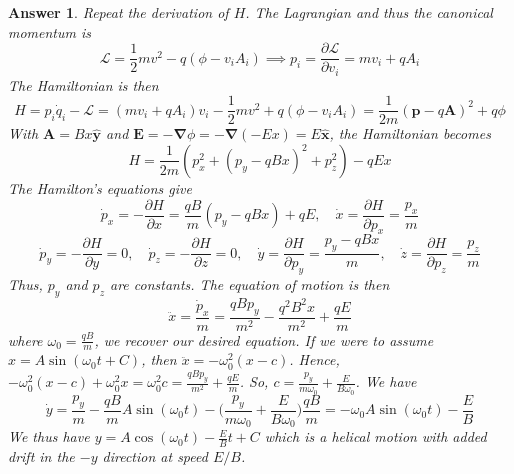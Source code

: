 \documentclass[a4paper]{article}
\newtheorem{ans}{Answer}[section]
\theoremstyle{new}
\begin{document}
\begin{ans}
Repeat the derivation of $H$. The Lagrangian and thus the canonical momentum is
$$\mathcal{L}=\frac{1}{2}mv^2-q(\phi-v_iA_i)\implies p_i=\frac{\partial\mathcal{L}}{\partial v_i}=mv_i+qA_i$$
The Hamiltonian is then
$$H=p_i\dot{q}_i-\mathcal{L}=(mv_i+qA_i)v_i-\frac{1}{2}mv^2+q(\phi-v_iA_i)=\frac{1}{2m}(\mathbf{p}-q\mathbf{A})^2+q\phi$$
With $\mathbf{A}=Bx\mathbf{\hat{y}}$ and $\mathbf{E}=-\boldsymbol{\nabla}\phi=-\boldsymbol{\nabla}(-Ex)=E\mathbf{\hat{x}}$, the Hamiltonian becomes
$$H=\frac{1}{2m}(p_x^2+(p_y-qBx)^2+p_z^2)-qEx$$
The Hamilton's equations give
$$\dot{p}_x=-\frac{\partial H}{\partial x}=\frac{qB}{m}(p_y-qBx)+qE,\quad\dot{x}=\frac{\partial H}{\partial p_x}=\frac{p_x}{m}$$
$$\dot{p}_y=-\frac{\partial H}{\partial y}=0,\quad\dot{p}_z=-\frac{\partial H}{\partial z}=0,\quad\dot{y}=\frac{\partial H}{\partial p_y}=\frac{p_y-qBx}{m},\quad\dot{z}=\frac{\partial H}{\partial p_z}=\frac{p_z}{m}$$
Thus, $p_y$ and $p_z$ are constants. The equation of motion is then 
$$\ddot{x}=\frac{\dot{p}_x}{m}=\frac{qBp_y}{m^2}-\frac{q^2B^2x}{m^2}+\frac{qE}{m}$$
where $\omega_0=\frac{qB}{m}$, we recover our desired equation. If we were to assume $x=A\sin(\omega_0t+C)$, then $\ddot{x}=-\omega_0^2(x-c)$. Hence, $-\omega_0^2(x-c)+\omega_0^2x=\omega_0^2c=\frac{qBp_y}{m^2}+\frac{qE}{m}$. So, $c=\frac{p_y}{m\omega_0}+\frac{E}{B\omega_0}$. We have
$$\dot{y}=\frac{p_y}{m}-\frac{qB}{m}A\sin(\omega_0t)-\bigg(\frac{p_y}{m\omega_0}+\frac{E}{B\omega_0}\bigg)\frac{qB}{m}=-\omega_0A\sin(\omega_0t)-\frac{E}{B}$$
We thus have $y=A\cos(\omega_0t)-\frac{E}{B}t+C$ which is a helical motion with added drift in the $-y$ direction at speed $E/B$.
\end{ans}

\newpage
\end{document}
